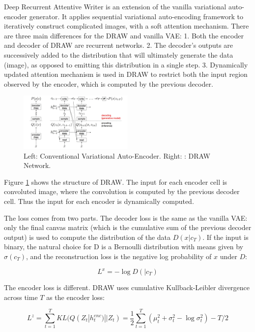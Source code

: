 \documentclass[10pt]{article}
\begin{document}
Deep Recurrent Attentive Writer \cite{gregor2015draw} is an extension of the vanilla variational auto-encoder generator. It applies sequential variational auto-encoding framework to iteratively construct complicated images, with a soft attention mechanism. There are three main differences for the DRAW and vanilla VAE: 1. Both the encoder and decoder of DRAW are recurrent networks. 2. The decoder’s outputs are successively added to the distribution that will ultimately generate the data (image), as opposed to emitting this distribution in a single step. 3. Dynamically updated attention mechanism is used in DRAW to restrict both the input region observed by the encoder, which is computed by the previous decoder.

\begin{figure}[!ht]\centering
\includegraphics[width=0.5\textwidth]{images/draw_structure.png}
\caption{Left: Conventional Variational Auto-Encoder. Right: : DRAW Network. \cite{gregor2015draw}}
\label{figure:draw_structure}
\end{figure}

Figure \ref{figure:draw_structure} shows the structure of DRAW. The input for each encoder cell is convoluted image, where the convolution is computed by the previous decoder cell. Thus the input for each encoder is dynamically computed.

The loss comes from two parts. The decoder loss is the same as the vanilla VAE: only the final canvas matrix (which is the cumulative sum of the previous decoder output) is used to compute the distribution of the data $D(x|c_T)$. If the input is binary, the natural choice for D is a Bernoulli distribution with means given by $\sigma(c_T)$, and the reconstruction loss is the negative log probability of $x$ under $D$:

$$L^{x} = - \log D(|c_T)$$

The encoder loss is different. DRAW uses cumulative Kullback-Leibler divergence across time $T$ as the encoder loss:

$$L^z = \sum_{t=1}^{T} KL(Q(Z_t|h_{t}^{enc})||Z_t) = \frac{1}{2}\sum_{t=1}^{T}(\mu_t^2 + \sigma_t^2 - \log \sigma^2_t) - T/2$$
\end{document}
